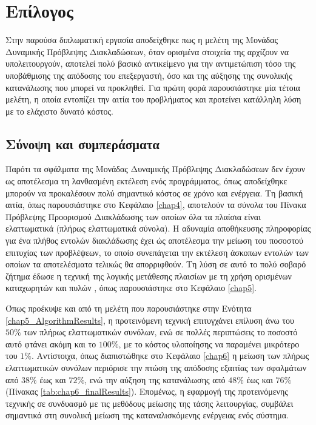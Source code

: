\chapter{Επίλογος}
\label{chap8}

Στην παρούσα διπλωματική εργασία αποδείχθηκε πως η μελέτη της Μονάδας Δυναμικής Πρόβλεψης Διακλαδώσεων, όταν ορισμένα στοιχεία της αρχίζουν να υπολειτουργούν, αποτελεί πολύ βασικό αντικείμενο για την αντιμετώπιση τόσο της υποβάθμισης της απόδοσης του επεξεργαστή, όσο και της αύξησης της συνολικής κατανάλωσης που μπορεί να προκληθεί. Για πρώτη φορά παρουσιάστηκε μία τέτοια μελέτη, η οποία εντοπίζει την αιτία του προβλήματος και προτείνει κατάλληλη λύση με το ελάχιστο δυνατό κόστος.

\section{Σύνοψη και συμπεράσματα}

Παρότι τα σφάλματα της Μονάδας Δυναμικής Πρόβλεψης Διακλαδώσεων δεν έχουν ως αποτέλεσμα τη λανθασμένη εκτέλεση ενός προγράμματος, όπως αποδείχθηκε μπορούν να προκαλέσουν πολύ σημαντικό κόστος σε χρόνο και ενέργεια. Τη βασική αιτία, όπως παρουσιάστηκε στο Κεφάλαιο \ref{chap4}, αποτελούν τα σύνολα του Πίνακα Πρόβλεψης Προορισμού Διακλάδωσης των οποίων όλα τα πλαίσια είναι ελαττωματικά (πλήρως ελαττωματικά σύνολα). Η αδυναμία αποθήκευσης πληροφορίας για ένα πλήθος εντολών διακλάδωσης έχει ώς αποτέλεσμα την μείωση του ποσοστού επιτυχίας των προβλέψεων, το οποίο συνεπάγεται την εκτέλεση άσκοπων εντολών των οποίων τα αποτελέσματα τελικώς θα απορριφθούν. Τη λύση σε αυτό το πολύ σοβαρό ζήτημα έδωσε η τεχνική της λογικής μετάθεσης πλαισίων με τη χρήση ορισμένων καταχωρητών και πυλών \xor, όπως παρουσιάστηκε στο Κεφάλαιο \ref{chap5}.
\par
Όπως προέκυψε και από τη μελέτη που παρουσιάστηκε στην Ενότητα \ref{chap5_AlgorithmResults}, η προτεινόμενη τεχνική επιτυγχάνει επίλυση άνω του $50\%$ των πλήρως ελαττωματικών συνόλων, ενώ σε πολλές περιπτώσεις το ποσοστό αυτό φτάνει ακόμη και το $100\%$, με το κόστος υλοποίησης να παραμένει μικρότερο του $1\%$. Αντίστοιχα, όπως διαπιστώθηκε στο Κεφάλαιο \ref{chap6} η μείωση των πλήρως ελαττωματικών συνόλων περιόρισε την πτώση της απόδοσης εξαιτίας των σφαλμάτων από $38\%$ έως και $72\%$, ενώ την αύξηση της κατανάλωσης από $48\%$ έως και $76\%$ (Πίνακας \ref{tab:chap6_finalResults}). Επομένως, η εφαρμογή της προτεινόμενης τεχνικής σε συνδυασμό με τις μεθόδους μείωσης της τάσης λειτουργίας, συμβάλει σημαντικά στη συνολική μείωση της καταναλισκόμενης ενέργειας ενός σύστημα.

